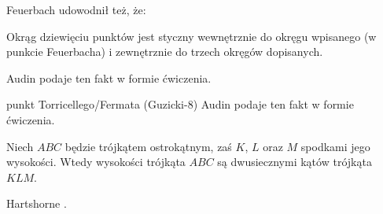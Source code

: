 Feuerbach udowodnił też, że:

\begin{theorem}[Feuerbacha]
	Okrąg dziewięciu punktów jest styczny wewnętrznie do okręgu wpisanego (w punkcie Feuerbacha) i zewnętrznie do trzech okręgów dopisanych.
\end{theorem}

Audin \cite[s. 110]{audin_2003} podaje ten fakt w formie ćwiczenia.

punkt Torricellego/Fermata (Guzicki-8)
Audin \cite[s. 105]{audin_2003} podaje ten fakt w formie ćwiczenia.

\begin{proposition}
	\label{orthic_triangle}
	Niech $ABC$ będzie trójkątem ostrokątnym, zaś $K$, $L$ oraz $M$ spodkami jego wysokości.
	Wtedy wysokości trójkąta $ABC$ są dwusiecznymi kątów trójkąta $KLM$.
\end{proposition}

Hartshorne \cite[s. 58]{hartshorne2000}.

%